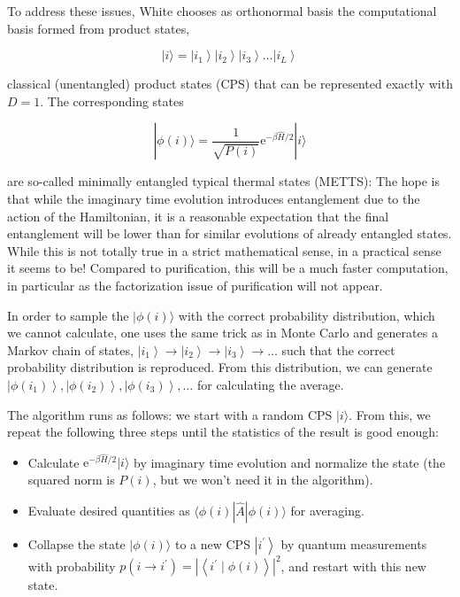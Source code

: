 \documentclass[12pt]{article}
\begin{document}
To address these issues, White chooses as orthonormal basis the computational basis formed from product states,


\begin{equation*}
|i\rangle=\left|i_{1}\right\rangle\left|i_{2}\right\rangle\left|i_{3}\right\rangle \ldots\left|i_{L}\right\rangle \tag{302}
\end{equation*}


classical (unentangled) product states (CPS) that can be represented exactly with $D=1$. The corresponding states


\begin{equation*}
|\phi(i)\rangle=\frac{1}{\sqrt{P(i)}} \mathrm{e}^{-\beta \hat{H} / 2}|i\rangle \tag{303}
\end{equation*}


are so-called minimally entangled typical thermal states (METTS): The hope is that while the imaginary time evolution introduces entanglement due to the action of the Hamiltonian, it is a reasonable expectation that the final entanglement will be lower than for similar evolutions of already entangled states. While this is not totally true in a strict mathematical sense, in a practical sense it seems to be! Compared to purification, this will be a much faster computation, in particular as the factorization issue of purification will not appear.

In order to sample the $|\phi(i)\rangle$ with the correct probability distribution, which we cannot calculate, one uses the same trick as in Monte Carlo and generates a Markov chain of states, $\left|i_{1}\right\rangle \rightarrow\left|i_{2}\right\rangle \rightarrow\left|i_{3}\right\rangle \rightarrow \ldots$ such that the correct probability distribution is reproduced. From this distribution, we can generate $\left|\phi\left(i_{1}\right)\right\rangle,\left|\phi\left(i_{2}\right)\right\rangle,\left|\phi\left(i_{3}\right)\right\rangle, \ldots$ for calculating the average.

The algorithm runs as follows: we start with a random CPS $|i\rangle$. From this, we repeat the following three steps until the statistics of the result is good enough:

\begin{itemize}
  \item Calculate $\mathrm{e}^{-\beta \hat{H} / 2}|i\rangle$ by imaginary time evolution and normalize the state (the squared norm is $P(i)$, but we won't need it in the algorithm).
  \item Evaluate desired quantities as $\langle\phi(i)|\hat{A}| \phi(i)\rangle$ for averaging.
  \item Collapse the state $|\phi(i)\rangle$ to a new CPS $\left|i^{\prime}\right\rangle$ by quantum measurements with probability $p\left(i \rightarrow i^{\prime}\right)=\left|\left\langle i^{\prime} \mid \phi(i)\right\rangle\right|^{2}$, and restart with this new state.
\end{itemize}
\end{document}
